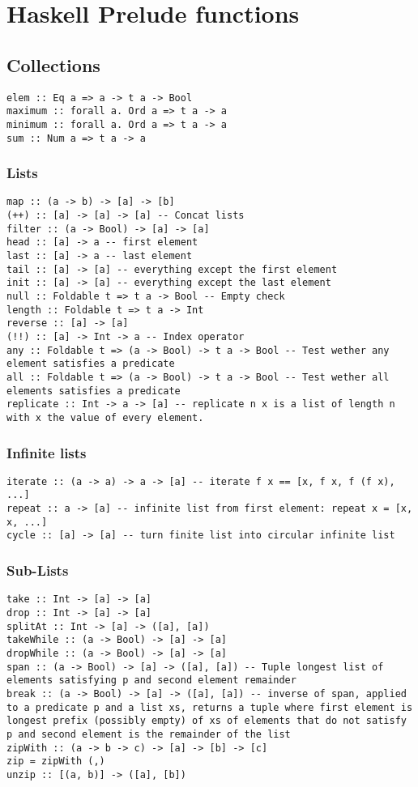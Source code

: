 \appendix\section{Haskell Prelude functions}
\subsection{Collections}
\begin{verbatim}
elem :: Eq a => a -> t a -> Bool 
maximum :: forall a. Ord a => t a -> a
minimum :: forall a. Ord a => t a -> a
sum :: Num a => t a -> a
\end{verbatim}
\subsubsection{Lists}
\begin{verbatim}
map :: (a -> b) -> [a] -> [b]
(++) :: [a] -> [a] -> [a] -- Concat lists
filter :: (a -> Bool) -> [a] -> [a]
head :: [a] -> a -- first element
last :: [a] -> a -- last element
tail :: [a] -> [a] -- everything except the first element
init :: [a] -> [a] -- everything except the last element
null :: Foldable t => t a -> Bool -- Empty check
length :: Foldable t => t a -> Int
reverse :: [a] -> [a]
(!!) :: [a] -> Int -> a -- Index operator
any :: Foldable t => (a -> Bool) -> t a -> Bool -- Test wether any element satisfies a predicate
all :: Foldable t => (a -> Bool) -> t a -> Bool -- Test wether all elements satisfies a predicate
replicate :: Int -> a -> [a] -- replicate n x is a list of length n with x the value of every element.
\end{verbatim}
\subsubsection{Infinite lists}
\begin{verbatim}
iterate :: (a -> a) -> a -> [a] -- iterate f x == [x, f x, f (f x), ...]
repeat :: a -> [a] -- infinite list from first element: repeat x = [x, x, ...]
cycle :: [a] -> [a] -- turn finite list into circular infinite list
\end{verbatim}
\subsubsection{Sub-Lists}
\begin{verbatim}
take :: Int -> [a] -> [a]
drop :: Int -> [a] -> [a]
splitAt :: Int -> [a] -> ([a], [a])
takeWhile :: (a -> Bool) -> [a] -> [a]
dropWhile :: (a -> Bool) -> [a] -> [a]
span :: (a -> Bool) -> [a] -> ([a], [a]) -- Tuple longest list of elements satisfying p and second element remainder
break :: (a -> Bool) -> [a] -> ([a], [a]) -- inverse of span, applied to a predicate p and a list xs, returns a tuple where first element is longest prefix (possibly empty) of xs of elements that do not satisfy p and second element is the remainder of the list
zipWith :: (a -> b -> c) -> [a] -> [b] -> [c]
zip = zipWith (,)
unzip :: [(a, b)] -> ([a], [b])
\end{verbatim}
